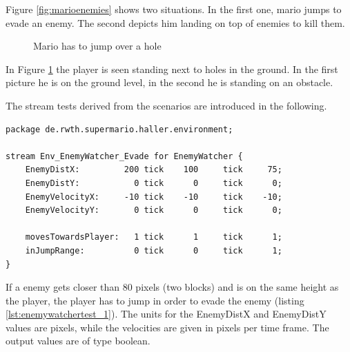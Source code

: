 Figure \ref{fig:marioenemies} shows two situations. In the first one, mario jumps to evade an enemy. The second depicts him landing on top of enemies to kill them.

\begin{figure} 
	\centering
	\caption{Mario has to jump over a hole} 
	\label{fig:mariohole}
\end{figure} 
In Figure \ref{fig:mariohole} the player is seen standing next to holes in the ground. In the first picture he is on the ground level, in the second he is standing on an obstacle.

The stream tests derived from the scenarios are introduced in the following.
\begin{lstlisting}[float,label=lst:enemywatchertest_1, caption=Enemy watcher stream test]
package de.rwth.supermario.haller.environment;

stream Env_EnemyWatcher_Evade for EnemyWatcher {
    EnemyDistX:         200 tick    100     tick     75;
    EnemyDistY:           0 tick      0     tick      0;
    EnemyVelocityX:     -10 tick    -10     tick    -10;
    EnemyVelocityY:       0 tick      0     tick      0;
            
    movesTowardsPlayer:   1 tick      1     tick      1;
    inJumpRange:          0 tick      0     tick      1;
}
\end{lstlisting}
If a enemy gets closer than 80 pixels (two blocks) and is on the same height as the player, the player has to jump in order to evade the enemy (listing \ref{lst:enemywatchertest_1}). The units for the EnemyDistX and EnemyDistY values are pixels, while the velocities are given in pixels per time frame.
The output values are of type boolean.

